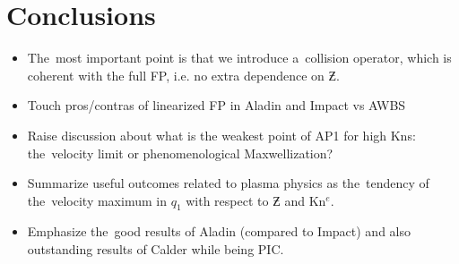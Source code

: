 \section{Conclusions}
\label{sec:Conclusions}

\begin{itemize}
  \item The~most important point is that we introduce a~collision operator, 
    which is coherent with the full FP, i.e. no extra dependence on $\Zbar$.
  \item Touch pros/contras of linearized FP in Aladin and Impact vs AWBS
  \item Raise discussion about what is the weakest point of AP1 for high Kns: 
    the~velocity limit or phenomenological Maxwellization?
  \item Summarize useful outcomes related to plasma physics as 
    the~tendency of the~velocity maximum in $q_1$ with respect to $\Zbar$ and
	Kn$^e$.
  \item Emphasize the~good results of Aladin (compared to Impact) and also
    outstanding results of Calder while being PIC. 
\end{itemize}
